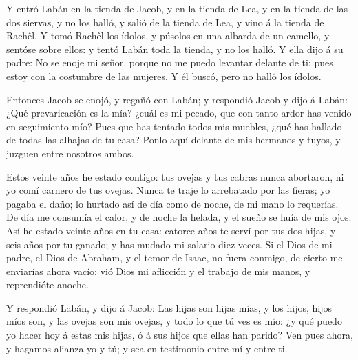  Y entró Labán en la tienda de Jacob, y en la tienda de
Lea, y en la tienda de las dos siervas, y no los halló, y salió de la
tienda de Lea, y vino á la tienda de Rachêl.  Y tomó Rachêl
los ídolos, y púsolos en una albarda de un camello, y sentóse sobre
ellos: y tentó Labán toda la tienda, y no los halló.  Y
ella dijo á su padre: No se enoje mi señor, porque no me puedo levantar
delante de ti; pues estoy con la costumbre de las mujeres. Y él buscó,
pero no halló los ídolos.

 Entonces Jacob se enojó, y regañó con Labán; y respondió
Jacob y dijo á Labán: ¿Qué prevaricación es la mía? ¿cuál es mi pecado,
que con tanto ardor has venido en seguimiento mío?  Pues
que has tentado todos mis muebles, ¿qué has hallado de todas las alhajas
de tu casa? Ponlo aquí delante de mis hermanos y tuyos, y juzguen entre
nosotros ambos.

 Estos veinte años he estado contigo: tus ovejas y tus
cabras nunca abortaron, ni yo comí carnero de tus ovejas. 
Nunca te traje lo arrebatado por las fieras; yo pagaba el daño; lo
hurtado así de día como de noche, de mi mano lo requerías. 
De día me consumía el calor, y de noche la helada, y el sueño se huía de
mis ojos.  Así he estado veinte años en tu casa: catorce
años te serví por tus dos hijas, y seis años por tu ganado; y has mudado
mi salario diez veces.  Si el Dios de mi padre, el Dios de
Abraham, y el temor de Isaac, no fuera conmigo, de cierto me enviarías
ahora vacío: vió Dios mi aflicción y el trabajo de mis manos, y
reprendióte anoche.

 Y respondió Labán, y dijo á Jacob: Las hijas son hijas
mías, y los hijos, hijos míos son, y las ovejas son mis ovejas, y todo
lo que tú ves es mío: ¿y qué puedo yo hacer hoy á estas mis hijas, ó á
sus hijos que ellas han parido?  Ven pues ahora, y hagamos
alianza yo y tú; y sea en testimonio entre mí y entre ti.

